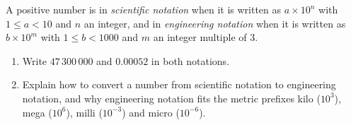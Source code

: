 A positive number is in \emph{scientific notation} when it is written as $a\times10^n$ with $1\le a<10$ and $n$ an integer, and in \emph{engineering notation} when it is written as $b\times10^m$ with $1\le b<1000$ and $m$ an integer multiple of $3$.
\begin{enumerate}
\item[(a)] Write $47\,300\,000$ and $0.00052$ in both notations.
\item[(b)] Explain how to convert a number from scientific notation to engineering notation, and why engineering notation fits the metric prefixes kilo ($10^3$), mega ($10^6$), milli ($10^{-3}$) and micro ($10^{-6}$).
\end{enumerate}
